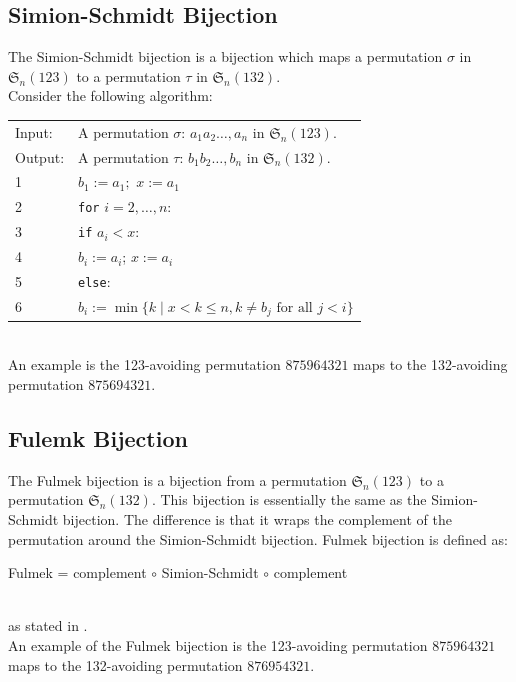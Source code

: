 \documentclass[12pt]{article}
\newcommand{\sym}{\mathfrak{S}}
\begin{document}
\subsection{Simion-Schmidt Bijection}
\label{sec:SSBijection}
The Simion-Schmidt bijection is a bijection which maps a permutation $\sigma$ in $\sym_n(123)$ to a permutation $\tau$ in $\sym_n(132)$.\cite{Clae01}\\
Consider the following algorithm: \\
\begin{tabular}{ll}
Input:  & A permutation $\sigma$: $a_1a_2\dots,a_n$ in $\sym_n(123)$.\\
Output: & A permutation $\tau$: $b_1b_2\dots,b_n$ in $\sym_n(132)$. \\
1 &\mbox{} $b_1:=a_1;$ $x:=a_1$\\
2 &\mbox{} {\tt for} $i=2, \dots,  n$: \\
3 &\mbox{} \quad\; {\tt if} $a_i < x$: \\
4 &\mbox{} \quad\;\quad\; $b_i:=a_i$; $x:=a_i$\\
5 &\mbox{} \quad\; {\tt else}:\\
6 &\mbox{} \quad\;\quad\;
$b_i:=\min\{k\mid x<k\leq n,k\neq b_j\textrm{ for all } j<i\}$\\
\end{tabular}\\
An example is the 123-avoiding permutation $875964321$ maps to the 132-avoiding permutation $875694321$.

\subsection{Fulemk Bijection}
The Fulmek bijection is a bijection from a permutation $\sym_n(123)$ to a permutation $\sym_n(132)$. This bijection is essentially the same as the Simion-Schmidt bijection. The difference is that it wraps the complement of the permutation around the Simion-Schmidt bijection. Fulmek bijection is defined as:\\
\centerline{Fulmek = complement $\circ$ Simion-Schmidt $\circ$ complement}\\
as stated in \cite{Clae01}.\\
An example of the Fulmek bijection is the 123-avoiding permutation $875964321$ maps to the 132-avoiding permutation $876954321$.
\end{document}
